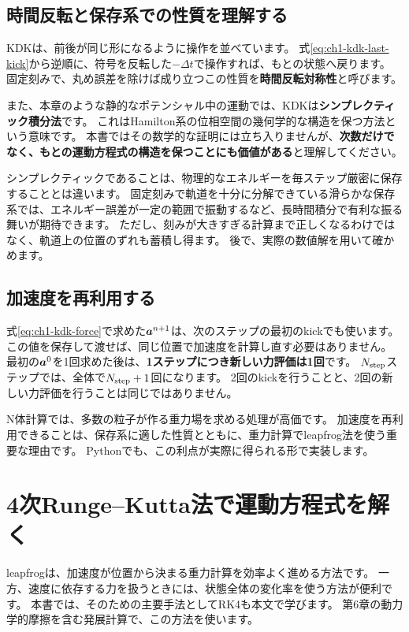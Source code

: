 \subsection{時間反転と保存系での性質を理解する}

KDKは、前後が同じ形になるように操作を並べています。
式\eqref{eq:ch1-kdk-last-kick}から逆順に、符号を反転した$-\Delta t$で操作すれば、もとの状態へ戻ります。
固定刻みで、丸め誤差を除けば成り立つこの性質を\textbf{時間反転対称性}と呼びます。

また、本章のような静的なポテンシャル中の運動では、KDKは\textbf{シンプレクティック積分法}です。
これはHamilton系の位相空間の幾何学的な構造を保つ方法という意味です。
本書ではその数学的な証明には立ち入りませんが、\textbf{次数だけでなく、もとの運動方程式の構造を保つことにも価値がある}と理解してください。\cite{simten2007}

シンプレクティックであることは、物理的なエネルギーを毎ステップ厳密に保存することとは違います。
固定刻みで軌道を十分に分解できている滑らかな保存系では、エネルギー誤差が一定の範囲で振動するなど、長時間積分で有利な振る舞いが期待できます。
ただし、刻みが大きすぎる計算まで正しくなるわけではなく、軌道上の位置のずれも蓄積し得ます。
後で、実際の数値解を用いて確かめます。

\subsection{加速度を再利用する}

式\eqref{eq:ch1-kdk-force}で求めた$\boldsymbol a^{n+1}$は、次のステップの最初のkickでも使います。
この値を保存して渡せば、同じ位置で加速度を計算し直す必要はありません。
最初の$\boldsymbol a^0$を1回求めた後は、\textbf{1ステップにつき新しい力評価は1回}です。
$N_{\rm step}$ステップでは、全体で$N_{\rm step}+1$回になります。
2回のkickを行うことと、2回の新しい力評価を行うことは同じではありません。

N体計算では、多数の粒子が作る重力場を求める処理が高価です。
加速度を再利用できることは、保存系に適した性質とともに、重力計算でleapfrog法を使う重要な理由です。\cite{simten2007}
Pythonでも、この利点が実際に得られる形で実装します。

\section{4次Runge--Kutta法で運動方程式を解く}
\label{sec:ch1-rk4}

leapfrogは、加速度が位置から決まる重力計算を効率よく進める方法です。
一方、速度に依存する力を扱うときには、状態全体の変化率を使う方法が便利です。
本書では、そのための主要手法としてRK4も本文で学びます。
第6章の動力学的摩擦を含む発展計算で、この方法を使います。

